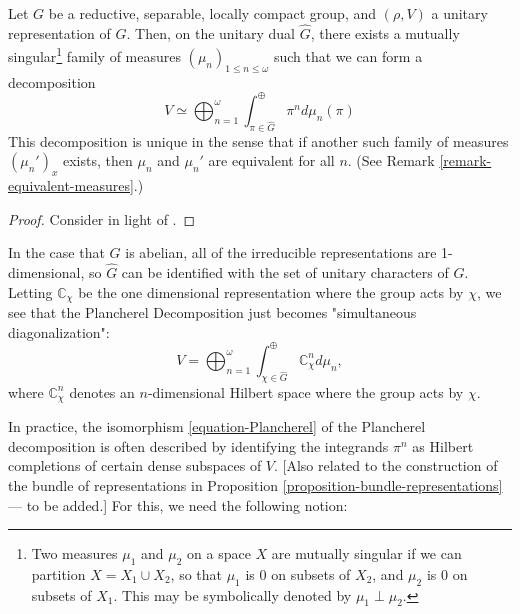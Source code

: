 \begin{theorem} 
\label{theorem-Plancherel-decomposition}
Let $G$ be a reductive, separable, locally compact group, and $(\rho, V)$ a unitary representation of $G$. Then, on the unitary dual $\hat{G}$, there exists a mutually singular\footnote{Two measures $\mu_1$ and $\mu_2$ on a space $X$ are mutually singular if we can partition $X=X_1 \cup X_2$, so that $\mu_1$ is $0$ on subsets of $X_2$, and $\mu_2$ is $0$ on subsets of $X_1$. This may be symbolically denoted by $\mu_1 \perp \mu_2$.} family of measures $(\mu_n)_{1\leq n\leq \omega}$ such that we can form a decomposition
\begin{equation}
\label{equation-Plancherel}
V \simeq \bigoplus_{n=1}^\omega \int_{\pi\in\hat{G}}^{\oplus} \pi^{n} d\mu_n (\pi)
\end{equation}
This decomposition is unique in the sense that if another such family of measures $(\mu_n')_x$ exists, then $\mu_n$ and $\mu_n'$ are equivalent for all $n$. (See Remark \ref{remark-equivalent-measures}.)
\end{theorem}

\begin{proof}
Consider \cite[8.6.6]{Dixmier-Cstar} in light of \cite[18.7.6]{Dixmier-Cstar}.
\end{proof}


\noindent
\begin{example}
\label{example-Plancherel-abelian}
In the case that $G$ is abelian, all of the irreducible representations are 1-dimensional, so $\hat G$ can be identified with the set of unitary characters of $G$. Letting $\mathbb{C}_\chi$ be the one dimensional representation where the group acts by $\chi$, we see that the Plancherel Decomposition just becomes "simultaneous diagonalization":
\[V = \bigoplus_{n=1}^\omega \int_{\chi\in\hat{G}}^{\oplus} \mathbb{C}_\chi^{n} d\mu_n,\]
where $\mathbb C_\chi^n$ denotes an $n$-dimensional Hilbert space where the group acts by $\chi$.
\end{example}

In practice, the isomorphism \eqref{equation-Plancherel} of the Plancherel decomposition is often described by identifying the integrands $\pi^n$ as Hilbert completions of certain dense subspaces of $V$. [Also related to the construction of the bundle of representations in Proposition \ref{proposition-bundle-representations} --- to be added.] For this, we need the following notion:


